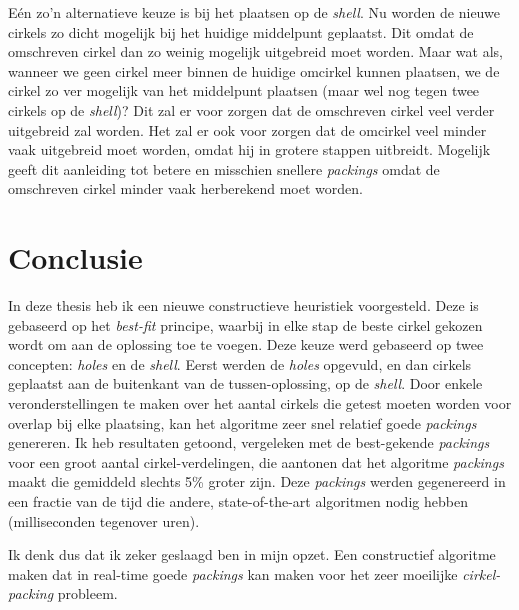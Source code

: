 \documentclass[12pt,a4paper,oneside]{book}
\begin{document}
{Eén zo'n alternatieve keuze is bij het plaatsen op de \textit{shell}.
Nu worden de nieuwe cirkels zo dicht mogelijk bij het huidige middelpunt geplaatst.
Dit omdat de omschreven cirkel dan zo weinig mogelijk uitgebreid moet worden.
Maar wat als, wanneer we geen cirkel meer binnen de huidige omcirkel kunnen plaatsen, we de cirkel zo ver mogelijk van het middelpunt plaatsen (maar wel nog tegen twee cirkels op de \textit{shell})?
Dit zal er voor zorgen dat de omschreven cirkel veel verder uitgebreid zal worden.
Het zal er ook voor zorgen dat de omcirkel veel minder vaak uitgebreid moet worden, omdat hij in grotere stappen uitbreidt.
Mogelijk geeft dit aanleiding tot betere en misschien snellere \textit{packings} omdat de omschreven cirkel minder vaak herberekend moet worden.

\chapter{Conclusie} \label{chap:conclusie}

In deze thesis heb ik een nieuwe constructieve heuristiek voorgesteld.
Deze is gebaseerd op het \textit{best-fit} principe, waarbij in elke stap de beste cirkel gekozen wordt om aan de oplossing toe te voegen.
Deze keuze werd gebaseerd op twee concepten: \textit{holes} en de \textit{shell}.
Eerst werden de \textit{holes} opgevuld, en dan cirkels geplaatst aan de buitenkant van de tussen-oplossing, op de \textit{shell}.
Door enkele veronderstellingen te maken over het aantal cirkels die getest moeten worden voor overlap bij elke plaatsing, kan het algoritme zeer snel relatief goede \textit{packings} genereren.
Ik heb resultaten getoond, vergeleken met de best-gekende \textit{packings} voor een groot aantal cirkel-verdelingen, die aantonen dat het algoritme \textit{packings} maakt die gemiddeld slechts 5\% groter zijn.
Deze \textit{packings} werden gegenereerd in een fractie van de tijd die andere, state-of-the-art algoritmen nodig hebben (milliseconden tegenover uren).


Ik denk dus dat ik zeker geslaagd ben in mijn opzet.
Een constructief algoritme maken dat in real-time goede \textit{packings} kan maken voor het zeer moeilijke \textit{cirkel-packing} probleem.



}
\end{document}

